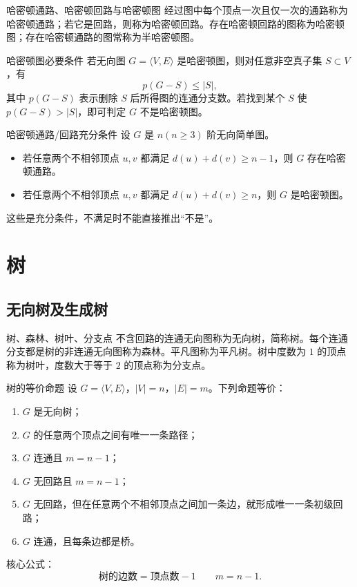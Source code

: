 \documentclass[UTF8,zihao=-4]{ctexart}
\begin{document}
\begin{corebox}{哈密顿通路、哈密顿回路与哈密顿图}
经过图中每个顶点一次且仅一次的通路称为哈密顿通路；若它是回路，则称为哈密顿回路。存在哈密顿回路的图称为哈密顿图；存在哈密顿通路的图常称为半哈密顿图。
\end{corebox}

\begin{corebox}{哈密顿图必要条件}
若无向图 $G=\langle V,E\rangle$ 是哈密顿图，则对任意非空真子集 $S\subset V$，有
\[
p(G-S)\le |S|,
\]
其中 $p(G-S)$ 表示删除 $S$ 后所得图的连通分支数。若找到某个 $S$ 使 $p(G-S)>|S|$，即可判定 $G$ 不是哈密顿图。
\end{corebox}

\begin{corebox}{哈密顿通路/回路充分条件}
设 $G$ 是 $n(n\ge3)$ 阶无向简单图。
\begin{itemize}
  \item 若任意两个不相邻顶点 $u,v$ 都满足 $d(u)+d(v)\ge n-1$，则 $G$ 存在哈密顿通路。
  \item 若任意两个不相邻顶点 $u,v$ 都满足 $d(u)+d(v)\ge n$，则 $G$ 是哈密顿图。
\end{itemize}
这些是充分条件，不满足时不能直接推出“不是”。
\end{corebox}

\section{树}

\subsection{无向树及生成树}

\begin{corebox}{树、森林、树叶、分支点}
不含回路的连通无向图称为无向树，简称树。每个连通分支都是树的非连通无向图称为森林。平凡图称为平凡树。树中度数为 $1$ 的顶点称为树叶，度数大于等于 $2$ 的顶点称为分支点。
\end{corebox}

\begin{corebox}{树的等价命题}
设 $G=\langle V,E\rangle$，$|V|=n$，$|E|=m$。下列命题等价：
\begin{enumerate}
  \item $G$ 是无向树；
  \item $G$ 的任意两个顶点之间有唯一一条路径；
  \item $G$ 连通且 $m=n-1$；
  \item $G$ 无回路且 $m=n-1$；
  \item $G$ 无回路，但在任意两个不相邻顶点之间加一条边，就形成唯一一条初级回路；
  \item $G$ 连通，且每条边都是桥。
\end{enumerate}
核心公式：
\[
\boxed{\text{树的边数}=\text{顶点数}-1}\qquad m=n-1.
\]
\end{corebox}
\end{document}
